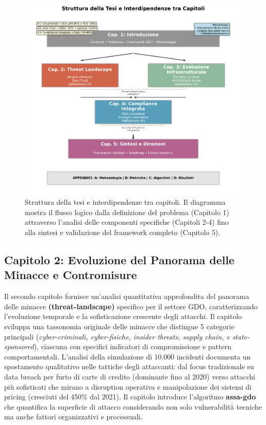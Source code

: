\begin{figure}[H]
\centering
\includegraphics[width=1\textwidth]{thesis_figures/cap1/fig_1_4_thesis_structure.pdf}
\caption{Struttura della tesi e interdipendenze tra capitoli. Il diagramma mostra il flusso logico dalla definizione del problema (Capitolo 1) attraverso l'analisi delle componenti specifiche (Capitoli 2-4) fino alla sintesi e validazione del framework completo (Capitolo 5).}
\label{fig:thesis_structure}
\end{figure}

\subsection{Capitolo 2: Evoluzione del Panorama delle Minacce e Contromisure}

\label{ssec:struttura_cap2}
Il secondo capitolo fornisce un'analisi quantitativa approfondita del panorama delle minacce \textbf{(\gls{threat-landscape})} specifico per il settore GDO, caratterizzando l'evoluzione temporale e la sofisticazione crescente degli attacchi. Il capitolo sviluppa una tassonomia originale delle minacce che distingue 5 categorie principali (\emph{cyber-criminali, cyber-fisiche, insider threats, supply chain, e state-sponsored}), ciascuna con specifici indicatori di compromissione e pattern comportamentali. L'analisi della simulazione di 10.000 incidenti documenta un spostamento qualitativo nelle tattiche degli attaccanti: dal focus tradizionale su data breach per furto di carte di credito (dominante fino al 2020) verso attacchi più sofisticati che mirano a disruption operativa e manipolazione dei sistemi di pricing (cresciuti del 450\% dal 2021).
Il capitolo introduce l'algoritmo \textbf{\gls{assa-gdo}} che quantifica la superficie di attacco considerando non solo vulnerabilità tecniche ma anche fattori organizzativi e processuali.

